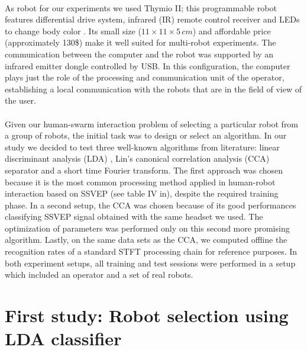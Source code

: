 \documentclass[smallextended]{svjour3}
\begin{document}
\\
As robot for our experiments we used Thymio II; this programmable robot features differential drive system, infrared (IR) remote control receiver and LEDs to change body color \cite{Riedo-et-al-2013}. Its small size ($11 \times 11 \times 5\,\mathit{cm}$) and affordable price (approximately 130\$) make it well suited for multi-robot experiments. 
The communication between the computer and the robot was supported by an infrared emitter dongle controlled by USB. 
In this configuration, the computer plays just the role of the processing and communication unit of the operator, establishing a local communication with the robots that are in the field of view of the user.\\
\\
Given our human-swarm interaction problem of selecting a particular robot from a group of robots, the initial task was to design or select an algorithm. In our study we decided to test three well-known algorithms from literature: linear discriminant analysis (LDA) \cite{openvibeSSVEP}, Lin's canonical correlation analysis (CCA) separator \cite{Lin2014}
and a short time Fourier transform. The first approach was chosen because it is the most common processing method applied in human-robot interaction based on SSVEP (see table IV in\cite{Bi2013}), despite the required training phase.
In a second setup, the CCA was chosen because of its good performances classifying SSVEP signal obtained with the same headset we used. The optimization of parameters was performed only on this second more promising algorithm.
Lastly, on the same data sets as the CCA, we computed offline the recognition rates of a standard STFT processing chain for reference purposes.
In both experiment setups, all training and test sessions were performed in a setup which included an operator and a set of real robots.\\

\section{First study: Robot selection using LDA classifier}
\label{sec:ML_approach}
\end{document}
